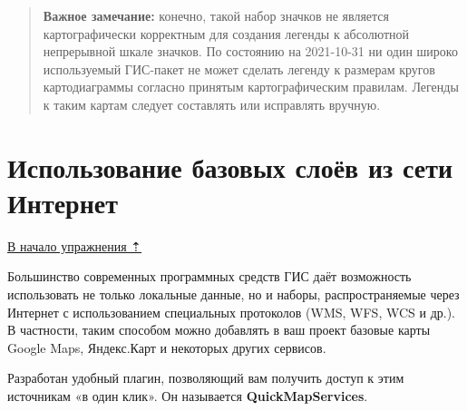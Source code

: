 \documentclass[
  12pt,
]{book}
\begin{document}
\begin{enumerate}
  \begin{quote}
  \textbf{Важное замечание:} конечно, такой набор значков не является картографически корректным для создания легенды к абсолютной непрерывной шкале значков. По состоянию на 2021-10-31 ни один широко используемый ГИС-пакет не может сделать легенду к размерам кругов картодиаграммы согласно принятым картографическим правилам. Легенды к таким картам следует составлять или исправлять вручную.
  \end{quote}
\end{enumerate}

\hypertarget{map-ref-districts-wms}{%
\section{Использование базовых слоёв из сети Интернет}\label{map-ref-districts-wms}}

\protect\hyperlink{map-ref-districts}{В начало упражнения ⇡}

Большинство современных программных средств ГИС даёт возможность использовать не только локальные данные, но и наборы, распространяемые через Интернет с использованием специальных протоколов (WMS, WFS, WCS и др.). В частности, таким способом можно добавлять в ваш проект базовые карты Google Maps, Яндекс.Карт и некоторых других сервисов.

Разработан удобный плагин, позволяющий вам получить доступ к этим источникам «в один клик». Он называется \textbf{QuickMapServices}.
\end{document}
